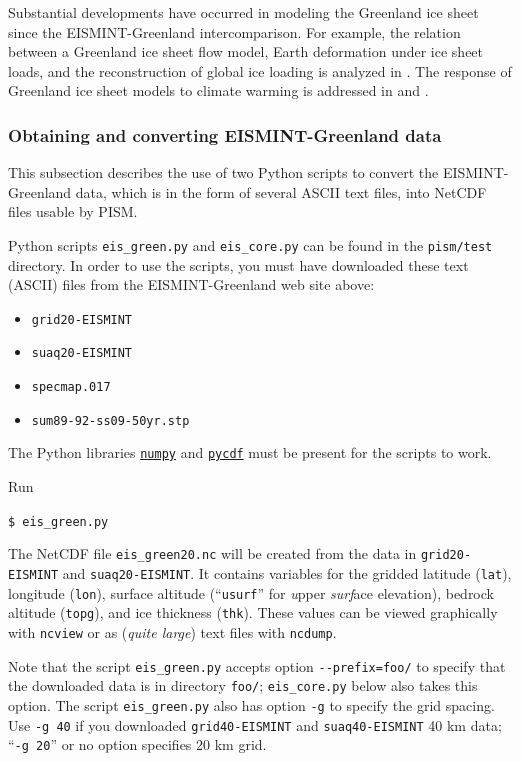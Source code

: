 \documentclass[11pt,final]{amsart}
\begin{document}
Substantial developments have occurred in modeling the Greenland ice sheet since the EISMINT-Greenland intercomparison.  For example, the relation between a Greenland ice sheet flow model, Earth deformation under ice sheet loads, and the reconstruction of global ice loading is analyzed in \cite{TarasovPeltier}.  The response of Greenland ice sheet models to climate warming is addressed in \cite{HuybrechtsdeWolde} and \cite{Greve00}.


\subsubsection*{Obtaining and converting EISMINT-Greenland data}  This subsection describes the use of two Python scripts to convert the EISMINT-Greenland data, which is in the form of several ASCII text files, into NetCDF files usable by PISM.

Python scripts \verb|eis_green.py| and \verb|eis_core.py| can be found in the \verb|pism/test| directory.  In order to use the scripts, you must have downloaded these text (ASCII) files from the EISMINT-Greenland web site above:\begin{itemize}
 \item \verb|grid20-EISMINT|
 \item \verb|suaq20-EISMINT|
 \item \verb|specmap.017|
 \item \verb|sum89-92-ss09-50yr.stp|
\end{itemize}
The Python libraries \href{http://numpy.scipy.org/}{\texttt{numpy}} and \href{http://pysclint.sourceforge.net/pycdf/}{\texttt{pycdf}} must be present for the scripts to work.

Run

\verb|$ eis_green.py|

The NetCDF file \verb|eis_green20.nc| will be created from the data in \verb|grid20-EISMINT| and \verb|suaq20-EISMINT|.  It contains variables for the gridded latitude (\verb|lat|), longitude (\verb|lon|), surface altitude (``\verb|usurf|'' for \emph{u}pper \emph{surf}ace elevation), bedrock altitude (\verb|topg|), and ice thickness (\verb|thk|).  These values can be viewed graphically with \verb|ncview| or as (\emph{quite large}) text files with \verb|ncdump|.

Note that the script \verb|eis_green.py| accepts option \verb|--prefix=foo/| to specify that the downloaded data is in directory \verb|foo/|; \verb|eis_core.py| below also takes this option.  The script \verb|eis_green.py| also has option \verb|-g| to specify the grid spacing.  Use \verb|-g 40| if you downloaded \verb|grid40-EISMINT| and \verb|suaq40-EISMINT| 40 km data; ``\verb|-g 20|'' or no option specifies 20 km grid.
\end{document}
